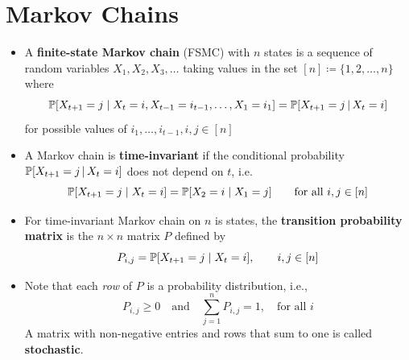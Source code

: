 \documentclass[11pt,twoside]{report}
\begin{document}
\section{Markov Chains}

\begin{itemize}

\item %
A \textbf{finite-state Markov chain}  (FSMC) with $n$ states is a sequence of random variables $X_{1},X_{2},X_{3},\ldots$  taking values in the set $[n]\coloneqq  \{ 1,2,\ldots,n \} $ where
\[
\pr{ X_{t+1}=j \mid X_{t}=i,X_{t-1} = i_{t-1} , \dots, X_{1} = i_1 } =\pr{ X_{t+1}=j\,\middle|\,X_{t}=i} 
\]
for possible values of  $i_1, \dots, i_{t-1},i,j \in [n]$



\item A Markov chain is \textbf{time-invariant} if the conditional probability $\pr{ X_{t+1}=j\,\middle|\,X_{t}=i} $ does not depend on $t$, i.e.  
\[
\pr{X_{t+1} =j \mid  X_t = i} = \pr{X_2 = i \mid  X_1 = j} \qquad \text{for all $i,j \in [n]$}
\]


  \ifans  \vspace*{2in}\else  
\item For time-invariant Markov chain on $n$ is states, the \textbf{transition probability  matrix } is the $n \times n$ matrix $P$ defined by
\[
P_{i,j} = \pr{X_{t+1} = j \mid  X_t= i}, \qquad i,j \in [n]
\]
\item  Note that  each \emph{row} of $P$ is a probability distribution, i.e., %
 \[
 P_{i,j}\geq0 \quad \text{and} \quad  \sum_{j=1}^{n}P_{i,j}=1, \quad \text{for all $i$}
\]
A matrix with non-negative entries and rows that sum to one is called \textbf{stochastic}. 




\end{itemize}
\end{document}
